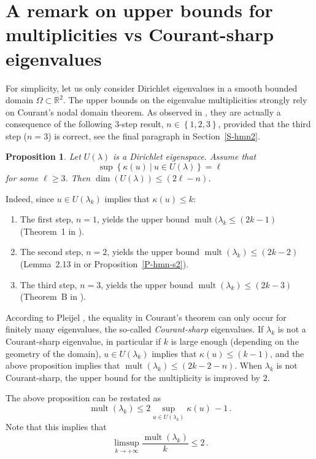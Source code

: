 \documentclass[12pt,a4paper]{amsart}
\theoremstyle{plain} %
\newtheorem{proposition}[theorem]{Proposition}
\theoremstyle{definition}
\numberwithin{equation}{section}
\numberwithin{figure}{section}
\numberwithin{table}{section}
\newcommand{\R}{\mathbb{R}}
\DeclareMathOperator{\mult}{mult}
\newcommand{\set}[1]{\left\lbrace #1 \right\rbrace}
\begin{document}
\vspace{2cm}
\newpage

\appendix

\section{A remark on upper bounds for multiplicities vs Courant-sharp eigenvalues}\label{S-mcs}

For simplicity, let us only consider Dirichlet eigenvalues in a smooth bounded domain $\Omega \subset \R^2$. The upper bounds on the eigenvalue multiplicities strongly rely on Courant's nodal domain theorem. As observed in \cite{HoMN1999}, they are actually a consequence of the following 3-step result, $n \in \set{1,2,3}$,  provided that the third step ($n=3$) is correct, see the final paragraph  in Section~\ref{S-hmn2}.

\begin{proposition}\label{P-propC1} Let $U(\lambda)$ is a Dirichlet eigenspace. Assume that $$\sup\set{\kappa(u) ~|~ u \in U(\lambda)} = \ell$$ for some $\ell \ge 3$. Then $\dim(U(\lambda)) \le (2\ell -n)$.
\end{proposition}

Indeed, since $u \in U(\lambda_k)$ implies that $\kappa(u) \le k$:
\begin{enumerate}
  \item The first step, $n=1$, yields the upper bound $\mult(\lambda_k \le (2k-1)$  (Theorem~1 in \cite{Nadi1987}).
  \item The second step, $n=2$, yields the upper bound $\mult(\lambda_k) \le (2k-2)$ (Lemma~2.13 in \cite{HoMN1999} or Proposition~\ref{P-hmn-s2}).
  \item The third step, $n=3$, yields the upper bound $\mult(\lambda_k) \le (2k-3)$ (Theorem~B in \cite{HoMN1999}).
\end{enumerate}

According to Pleijel \cite{Plej1956}, the equality in Courant's theorem can only occur for finitely many eigenvalues, the so-called \emph{Courant-sharp} eigenvalues. If $\lambda_k$ is not a Courant-sharp eigenvalue, in particular if $k$ is large enough (depending on the geometry of the domain), $u \in U(\lambda_k)$ implies that $\kappa(u) \le (k-1)$, and the above proposition implies that $\mult(\lambda_k) \le (2k-2-n)$. When $\lambda_k$ is not Courant-sharp, the upper bound for the multiplicity is improved by $2$.\medskip


The above proposition can be restated as
%
\begin{equation}\label{E-mcs-2}
\mult(\lambda_k) \leq 2 \sup_{u \in U(\lambda_k)} \kappa(u)\, -1\,.
\end{equation}
%
Note that this implies that
%
\begin{equation*}\label{E-mcs-2a}
\limsup_{k\rightarrow +\infty}\frac{\mult(\lambda_k)}{k} \le 2\,.
\end{equation*}
\end{document}

